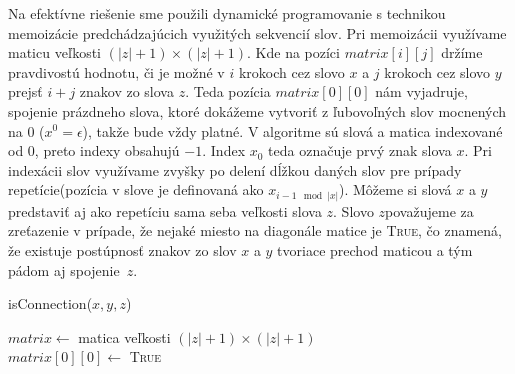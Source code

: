 \documentclass[12pt]{iv003}
\begin{document}
Na efektívne riešenie sme použili dynamické programovanie s technikou memoizácie predchádzajúcich využitých sekvencií slov. Pri memoizácii využívame maticu veľkosti $(|z| + 1) \times (|z| + 1)$. Kde na pozíci $matrix[i][j]$ držíme pravdivostú hodnotu, či je možné v $i$ krokoch cez slovo $x$ a $j$ krokoch cez slovo $y$ prejsť $i + j$ znakov zo slova $z$. Teda pozícia $matrix[0][0]$ nám vyjadruje, spojenie prázdneho slova, ktoré dokážeme vytvoriť z ľubovoľných slov mocnených na 0 ($x^{0} = \epsilon$), takže bude vždy platné. V algoritme sú slová a matica indexované od 0, preto indexy obsahujú $-1$. Index $x_{0}$ teda označuje prvý znak slova $x$. Pri indexácii slov využívame zvyšky po delení dĺžkou daných slov pre prípady repetície(pozícia v slove je definovaná ako $x_{i - 1 \mod |x|}$). Môžeme si slová $x$ a $y$ predstaviť aj ako repetíciu sama seba veľkosti slova $z$. Slovo $z$považujeme za zreťazenie v prípade, že nejaké miesto na diagonále matice je \textsc{True}, čo znamená, že existuje postúpnosť znakov zo slov $x$ a $y$ tvoriace prechod maticou a tým pádom aj spojenie~$z$.\\

\begin{procedure}[H]
	\caption{isConnection($x, y, z$)}
	$matrix \leftarrow$ matica veľkosti $(|z| + 1) \times (|z| + 1)$ \\
	$matrix[0][0] \leftarrow$ \textsc{True} \\
	 
\end{procedure}
\end{document}
